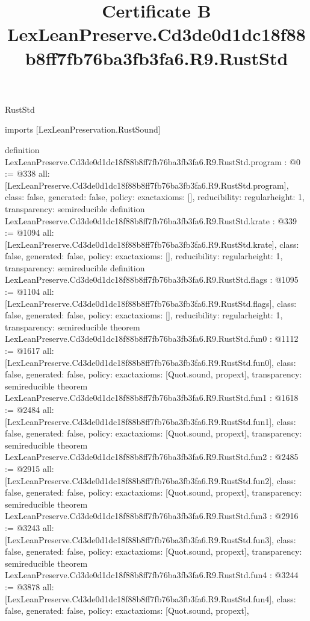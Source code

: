 \begin{lexlean}{RustStd}
\title{Certificate B LexLeanPreserve.Cd3de0d1dc18f88b8ff7fb76ba3fb3fa6.R9.RustStd}
\begin{coremodule}
imports [LexLeanPreservation.RustSound]

definition LexLeanPreserve.Cd3de0d1dc18f88b8ff7fb76ba3fb3fa6.R9.RustStd.program : @0 := @338 {
  all: [LexLeanPreserve.Cd3de0d1dc18f88b8ff7fb76ba3fb3fa6.R9.RustStd.program],
  class: false,
  generated: false,
  policy: exact{axioms: []},
  reducibility: regular{height: 1},
  transparency: semireducible
}
definition LexLeanPreserve.Cd3de0d1dc18f88b8ff7fb76ba3fb3fa6.R9.RustStd.krate : @339 := @1094 {
  all: [LexLeanPreserve.Cd3de0d1dc18f88b8ff7fb76ba3fb3fa6.R9.RustStd.krate],
  class: false,
  generated: false,
  policy: exact{axioms: []},
  reducibility: regular{height: 1},
  transparency: semireducible
}
definition LexLeanPreserve.Cd3de0d1dc18f88b8ff7fb76ba3fb3fa6.R9.RustStd.flags : @1095 := @1104 {
  all: [LexLeanPreserve.Cd3de0d1dc18f88b8ff7fb76ba3fb3fa6.R9.RustStd.flags],
  class: false,
  generated: false,
  policy: exact{axioms: []},
  reducibility: regular{height: 1},
  transparency: semireducible
}
theorem LexLeanPreserve.Cd3de0d1dc18f88b8ff7fb76ba3fb3fa6.R9.RustStd.fun0 : @1112 := @1617 {
  all: [LexLeanPreserve.Cd3de0d1dc18f88b8ff7fb76ba3fb3fa6.R9.RustStd.fun0],
  class: false,
  generated: false,
  policy: exact{axioms: [Quot.sound, propext]},
  transparency: semireducible
}
theorem LexLeanPreserve.Cd3de0d1dc18f88b8ff7fb76ba3fb3fa6.R9.RustStd.fun1 : @1618 := @2484 {
  all: [LexLeanPreserve.Cd3de0d1dc18f88b8ff7fb76ba3fb3fa6.R9.RustStd.fun1],
  class: false,
  generated: false,
  policy: exact{axioms: [Quot.sound, propext]},
  transparency: semireducible
}
theorem LexLeanPreserve.Cd3de0d1dc18f88b8ff7fb76ba3fb3fa6.R9.RustStd.fun2 : @2485 := @2915 {
  all: [LexLeanPreserve.Cd3de0d1dc18f88b8ff7fb76ba3fb3fa6.R9.RustStd.fun2],
  class: false,
  generated: false,
  policy: exact{axioms: [Quot.sound, propext]},
  transparency: semireducible
}
theorem LexLeanPreserve.Cd3de0d1dc18f88b8ff7fb76ba3fb3fa6.R9.RustStd.fun3 : @2916 := @3243 {
  all: [LexLeanPreserve.Cd3de0d1dc18f88b8ff7fb76ba3fb3fa6.R9.RustStd.fun3],
  class: false,
  generated: false,
  policy: exact{axioms: [Quot.sound, propext]},
  transparency: semireducible
}
theorem LexLeanPreserve.Cd3de0d1dc18f88b8ff7fb76ba3fb3fa6.R9.RustStd.fun4 : @3244 := @3878 {
  all: [LexLeanPreserve.Cd3de0d1dc18f88b8ff7fb76ba3fb3fa6.R9.RustStd.fun4],
  class: false,
  generated: false,
  policy: exact{axioms: [Quot.sound, propext]},
}
\end{coremodule}
\end{lexlean}
